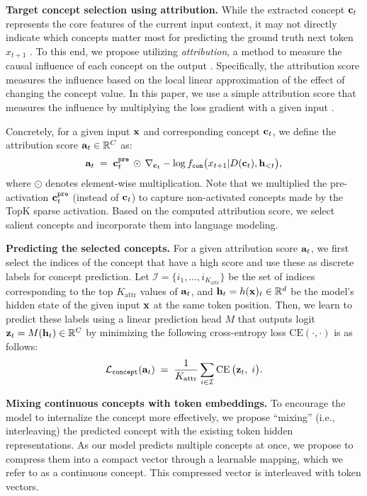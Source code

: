\documentclass[]{fairmeta}
\begin{document}
\textbf{Target concept selection using attribution.}
While the extracted concept ${\mathbf{c}}_t$ represents the core features of the current input context, it may not directly indicate which concepts matter most for predicting the ground truth next token $x_{t+1}$  \citep{templeton2024scaling}. To this end, we propose utilizing \emph{attribution}, a method to measure the causal influence of each concept on the output \citep{baehrens2010explain,sundararajan2017axiomatic}. Specifically, the attribution score measures the influence based on the local linear approximation of the effect of changing the concept value. In this paper, we use a simple attribution score that measures the influence by multiplying the loss gradient with a given input \citep{simonyan2014very,shrikumar2016not}.

Concretely, for a given input ${\mathbf{x}}$ and corresponding concept ${\mathbf{c}}_t$, we define the attribution score ${\mathbf{a}}_t\in\mathbb{R}^{C}$ as:
\begin{equation}
{\mathbf{a}}_t \;=\; 
{\mathbf{c}}_t^{\mathtt{pre}} \,\odot\, \nabla_{{\mathbf{c}}_t} -\log f_{\mathtt{con}}\big(x_{t+1}|D({\mathbf{c}}_{t}),{\mathbf{h}}_{<t}\big),
\end{equation}
where $\odot$ denotes element-wise multiplication. Note that we multiplied the pre-activation ${\mathbf{c}}_t^{\mathtt{pre}}$ (instead of ${\mathbf{c}}_t$) to capture non-activated concepts made by the TopK sparse activation. Based on the computed attribution score, we select salient concepts and incorporate them into language modeling.

\textbf{Predicting the selected concepts.} 
For a given attribution score ${\mathbf{a}}_t$, we first select the indices of the concept that have a high score and use these as discrete labels for concept prediction. Let $\mathcal{I}=\{i_1,\ldots,i_{K_{\text{attr}}}\}$ be the set of indices corresponding to the top $K_{\text{attr}}$ values of ${\mathbf{a}}_t$, and ${\mathbf{h}}_t=h({\mathbf{x}})_{t} \in \mathbb{R}^{d}$ be the model’s hidden state of the given input ${\mathbf{x}}$ at the same token position. Then, we learn to predict these labels using a linear prediction head $M$ that outputs logit ${\mathbf{z}}_t=M({\mathbf{h}}_t) \in \mathbb{R}^{C}$ by minimizing the following cross-entropy loss $\mathrm{CE}(\cdot, \cdot)$ is as follows:
\begin{equation}
    \mathcal{L}_{\mathtt{concept}}({\mathbf{a}}_t) 
    \;=\;
    \frac{1}{K_{\text{attr}}}\sum_{i \in \mathcal{I}} \mathrm{CE}~\!\bigl({\mathbf{z}}_t,\; i\bigr).
    \label{eq:concept_pred}
\end{equation}

\textbf{Mixing continuous concepts with token embeddings.}
To encourage the model to internalize the concept more effectively, we propose ``mixing'' (i.e., interleaving) the predicted concept with the existing token hidden representations. As our model predicts multiple concepts at once, we propose to compress them into a compact vector through a learnable mapping, which we refer to as a continuous concept. This compressed vector is interleaved with token vectors.
\end{document}
